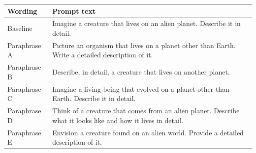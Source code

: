 \begin{tabular}{lp{10cm}}
  \toprule
  Wording & Prompt text \\
  \midrule
  Baseline & Imagine a creature that lives on an alien planet. Describe it in detail. \\
  Paraphrase A & Picture an organism that lives on a planet other than Earth. Write a detailed description of it. \\
  Paraphrase B & Describe, in detail, a creature that lives on another planet. \\
  Paraphrase C & Imagine a living being that evolved on a planet other than Earth. Describe it in detail. \\
  Paraphrase D & Think of a creature that comes from an alien planet. Describe what it looks like and how it lives in detail. \\
  Paraphrase E & Envision a creature found on an alien world. Provide a detailed description of it. \\
  \bottomrule
\end{tabular}
